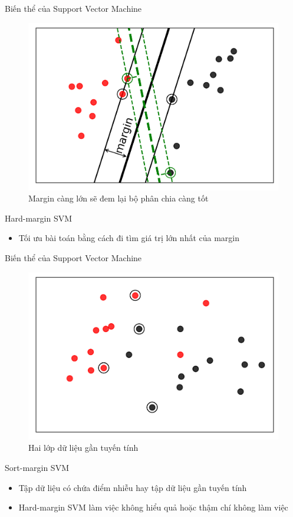 \documentclass[
	10pt,                %
	aspectratio=169,     %
]{beamer}
\begin{document}
	\begin{frame}{Biến thể của Support Vector Machine}
	    \begin{figure}[h!]
			\includegraphics[scale=0.5]{figures/svm3.png}
			\caption{Margin càng lớn sẽ đem lại bộ phân chia càng tốt}
		\end{figure}
    \begin{block}{Hard-margin SVM}
    	\begin{itemize}
    		\item Tối ưu bài toán bằng cách đi tìm giá trị lớn nhất của margin
    	\end{itemize}
        \end{block}
    \end{frame}	
    
        \begin{frame}{Biến thể của Support Vector Machine}
	    \begin{figure}[h!]
			\includegraphics[scale=0.5]{figures/ssvm1.png}
			\caption{Hai lớp dữ liệu gần tuyến tính}
		\end{figure}
    \begin{block}{Sort-margin SVM}
    	\begin{itemize}
    		\item  Tập dữ liệu có chứa điểm nhiễu hay tập dữ liệu gần tuyến tính
    		\item Hard-margin SVM làm việc không hiểu quả hoặc thậm chí không làm việc
    	\end{itemize}
        \end{block}
    \end{frame}
    
\end{document}
